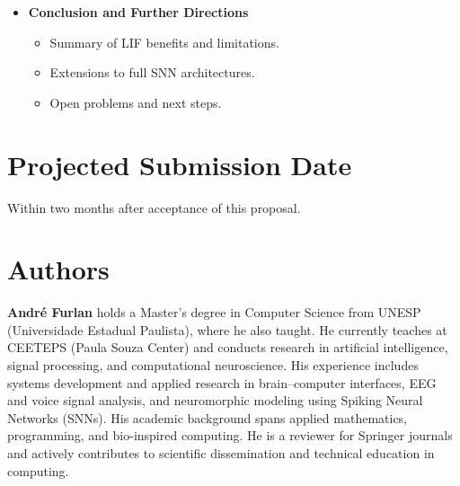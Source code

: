 \documentclass[journal,onecolumn]{IEEEtran}
\begin{document}
\begin{itemize}
\begin{itemize}
				\item Surrogate gradients and differentiable approximations.
				\item Use of HardTanh and derivative.
				\item End-to-end forward and backward pass in code.
			\end{itemize}
			\item \textbf{Conclusion and Further Directions}
			\begin{itemize}
				\item Summary of LIF benefits and limitations.
				\item Extensions to full SNN architectures.
				\item Open problems and next steps.
			\end{itemize}
		\end{itemize}
		
	\section{Projected Submission Date}
		\par Within two months after acceptance of this proposal.
			
	\section*{Authors}
		\par \textbf{André Furlan} holds a Master’s degree in Computer Science from UNESP (Universidade Estadual Paulista), where he also taught. He currently teaches at CEETEPS (Paula Souza Center) and conducts research in artificial intelligence, signal processing, and computational neuroscience. His experience includes systems development and applied research in brain–computer interfaces, EEG and voice signal analysis, and neuromorphic modeling using Spiking Neural Networks (SNNs). His academic background spans applied mathematics, programming, and bio-inspired computing. He is a reviewer for Springer journals and actively contributes to scientific dissemination and technical education in computing.
\end{document}
